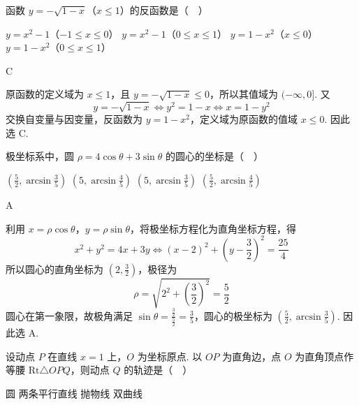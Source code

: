 \begin{problem}
函数 \(y=-\sqrt{1-x}\)（\(x\leqslant1\)）的反函数是（\(\quad\)）

\choices
    {\(y=x^{2}-1\)（\(-1\leqslant x\leqslant0\)）}
    {\(y=x^{2}-1\)（\(0\leqslant x\leqslant1\)）}
    {\(y=1-x^{2}\)（\(x\leqslant0\)）}
    {\(y=1-x^{2}\)（\(0\leqslant x\leqslant1\)）}
\end{problem}

\begin{answer}
C
\end{answer}

\begin{solution}
原函数的定义域为 \(x\leqslant1\)，且 \(y=-\sqrt{1-x}\leqslant0\)，所以其值域为 \((-\infty,0]\). 又
\[
y=-\sqrt{1-x}\Longleftrightarrow y^2=1-x\Longleftrightarrow x=1-y^2
\]
交换自变量与因变量，反函数为 \(y=1-x^2\)，定义域为原函数的值域 \(x\leqslant0\). 因此选 C.
\end{solution}

\begin{problem}
极坐标系中，圆 \( \rho = 4 \cos \theta + 3 \sin \theta \) 的圆心的坐标是（\(\quad\)）

\choices
    {\(\left(\frac{5}{2}, \arcsin \frac{3}{5}\right)\)}
    {\(\left(5, \arcsin \frac{4}{5}\right)\)}
    {\(\left(5, \arcsin \frac{3}{5}\right)\)}
    {\(\left(\frac{5}{2}, \arcsin \frac{4}{5}\right)\)}
\end{problem}

\begin{answer}
A
\end{answer}

\begin{solution}
利用 \(x=\rho\cos\theta\)，\(y=\rho\sin\theta\)，将极坐标方程化为直角坐标方程，得
\[
x^2+y^2=4x+3y\Longleftrightarrow
(x-2)^2+\left(y-\frac32\right)^2=\frac{25}{4}
\]
所以圆心的直角坐标为 \(\left(2,\frac32\right)\)，极径为
\[
\rho=\sqrt{2^2+\left(\frac32\right)^2}=\frac52
\]
圆心在第一象限，故极角满足 \(\sin\theta=\frac{\frac{3}{2}}{\frac{5}{2}}=\frac35\)，圆心的极坐标为 \(\left(\frac52,\arcsin\frac35\right)\). 因此选 A.
\end{solution}

\begin{problem}
设动点 \(P\) 在直线 \(x = 1\) 上，\(O\) 为坐标原点. 以 \(OP\) 为直角边，点 \(O\) 为直角顶点作等腰 \(\mathrm{Rt}\triangle OPQ\)，则动点 \(Q\) 的轨迹是（\(\quad\)）

\choices
    {圆}
    {两条平行直线}
    {抛物线}
    {双曲线}
\end{problem}

